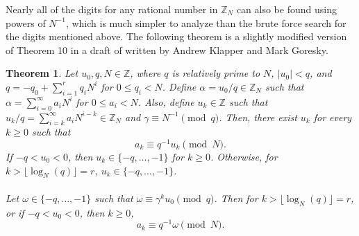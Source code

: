 \documentclass[english]{article}
\def\zzz{\mathbb{Z}}
\def\zzzn{\mathbb{Z}_N}
\theoremstyle{plain}
\newtheorem{theorem}{Theorem}[subsection]
\theoremstyle{definition}
\theoremstyle{remark}
\begin{document}
\par Nearly all of the digits for any rational number in $\zzzn$ can also be
found using powers of $N^{-1}$, which is much simpler to analyze than the
brute force search for the digits mentioned above. The following theorem is a
slightly modified version of Theorem 10 in a draft of \cite{bk:gk12} written
by Andrew Klapper and Mark Goresky.

\begin{theorem}\label{thm:10}
  Let $u_0,q,N\in\zzz$, where $q$ is relatively prime to $N$,
  $\lvert u_0 \rvert < q$, and $q=-q_0+\sum_{i=1}^{r}q_iN^i$ for
  $0 \leq q_i < N$. Define $\alpha = u_0/q \in \zzzn$
  such that $\alpha = \sum_{i=0}^{\infty}a_iN^i$ for $0 \leq a_i < N$.
  Also, define $u_k\in\zzz$ such that $u_k/q =
  \sum_{i=k}^{\infty}a_iN^{i-k} \in \zzzn$ and
  $\gamma \equiv N^{-1} \pmod q$. Then, there exist $u_k$ for every $k\geq0$
  such that
  \begin{equation}\label{eq:ak}
    a_k \equiv q^{-1}u_k \pmod N.
  \end{equation}
  If $-q<u_0<0$, then $u_k \in \{-q,\dots,-1\}$ for $k\geq0$.  Otherwise,
  for $k>\lfloor \log_N(q) \rfloor=r$, $u_k \in \{-q,\dots,-1\}$.
  \\ \\
  Let $\omega \in \{-q,\dots,-1\}$ such that $\omega \equiv
  \gamma^k u_0 \pmod q$.  Then for $k>\lfloor \log_N(q) \rfloor=r$, or if
  $-q<u_0<0$, then $k\geq0$,
  \begin{equation}\label{eq:ak-omega}
    a_k \equiv q^{-1}\omega \pmod N.
  \end{equation}
\end{theorem}
\noindent \\ 
\end{document}
